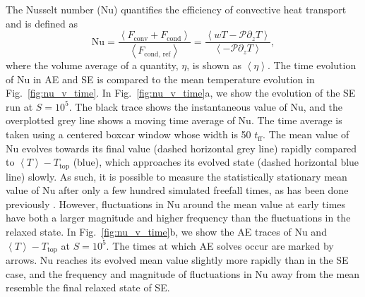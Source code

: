 \documentclass[aps, pre, onecolumn, nofootinbib, notitlepage, groupedaddress, amsfonts, amssymb, amsmath, longbibliography]{revtex4-1}
\newcommand{\angles}[1]{\ensuremath{\left\langle #1 \right\rangle}}
\begin{document}
The Nusselt number (Nu) quantifies the efficiency of convective heat transport
and is defined as
\begin{equation}
\text{Nu} = \frac{\angles{F_{\text{conv}} + F_{\text{cond}}}}{\angles{F_{\text{cond, ref}}}}
 = \frac{\angles{wT - \mathcal{P}\partial_z T}}{\angles{- \mathcal{P} \partial_z T}},
\end{equation}
where the volume average of a quantity, $\eta$, is shown as $\angles{\eta}$.
The time evolution of Nu in AE and SE is compared to the mean temperature evolution
in Fig.~\ref{fig:nu_v_time}. In Fig.~\ref{fig:nu_v_time}a, we show the evolution
of the SE run at $S = 10^5$. The black trace shows the instantaneous value of
Nu, and the overplotted grey line shows a moving time average of Nu. The
time average is taken using a centered boxcar window whose width is 50 $t_{\text{ff}}$.
The mean value of Nu evolves towards its final value (dashed horizontal
grey line) rapidly compared to $\angles{T}-T_{\text{top}}$ (blue), 
which approaches its evolved state (dashed horizontal blue line) slowly.
As such, it is possible to measure the statistically stationary mean value of
Nu after only a few hundred simulated freefall times, 
as has been done previously \cite{stevens&all2010}. However, fluctuations in
Nu around the mean value at early times have both a larger magnitude and higher
frequency than the fluctuations in the relaxed state.
In Fig.~\ref{fig:nu_v_time}b, we show the AE traces of Nu and
$\angles{T}-T_{\text{top}}$ at $S = 10^5$. The times at which AE solves occur are marked
by arrows. Nu reaches its evolved mean value slightly more rapidly than in the SE case,
and the frequency and magnitude of fluctuations in Nu away from the mean resemble the
final relaxed state of SE.
\end{document}
